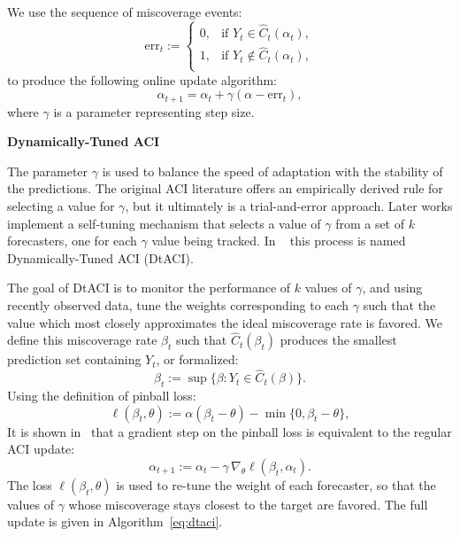 We use the sequence of miscoverage events:
\[
\mathrm{err}_t := 
\begin{cases}
0, & \text{if } Y_t \in \hat{C}_t(\alpha_t),\\
1, & \text{if } Y_t \notin \hat{C}_t(\alpha_t),\\
\end{cases}
\]
to produce the following online update algorithm:
\[
\alpha_{t+1}= \alpha_t + \gamma (\alpha - \mathrm{err}_t),
\]
where \(\gamma\) is a parameter representing step size. 

\textbf{Dynamically-Tuned ACI}

The parameter \(\gamma\) is used to balance the speed of adaptation with the stability of the predictions. The original ACI literature offers an empirically derived rule for selecting a value for \(\gamma\), but it ultimately is a trial-and-error approach. Later works implement a self-tuning mechanism that selects a value of \(\gamma\) from a set of \(k\) forecasters, one for each \(\gamma\) value being tracked. In ~\cite{gibbs2024conformal} this process is named Dynamically-Tuned ACI (DtACI). 

The goal of DtACI is to monitor the performance of \(k\) values of \(\gamma\), and using recently observed data, tune the weights corresponding to each \(\gamma\) such that the value which most closely approximates the ideal miscoverage rate is favored. We define this miscoverage rate \(\beta_t\) such that \(\hat{C}_t(\beta_t)\) produces the smallest prediction set containing \(Y_t\), or formalized:
\[
\beta_t := \sup \{ \beta : Y_t\in \hat{C}_t(\beta)\}.
\]
Using the definition of pinball loss:
\[
\ell(\beta_t,\theta):=\alpha(\beta_t-\theta)-\min\{0,\beta_t-\theta\},
\]
It is shown in~\cite{gibbs2024conformal} that a gradient step on the pinball loss is equivalent to the regular ACI update:
\[
\alpha_{t+1} := \alpha_t - \gamma \,\nabla_{\theta}\ell(\beta_t,\alpha_t).
\]
The loss \(\ell(\beta_t,\theta)\) is used to re-tune the weight of each forecaster, so that the values of \(\gamma\) whose miscoverage stays closest to the target are favored. The full update is given in Algorithm~\ref{eq:dtaci}.



